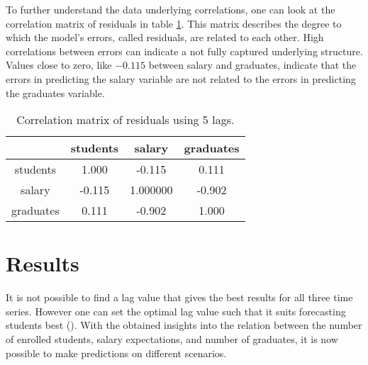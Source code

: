 \documentclass{article}
\theoremstyle{plain}
\theoremstyle{definition}
\theoremstyle{remark}
\begin{document}
To further understand the data underlying correlations, one can look at the correlation matrix
of residuals in table \ref{table:correlation matrix}.
This matrix describes the degree to which the model's errors, called residuals, are related to each other.
High correlations between errors can indicate a not fully captured underlying structure.
Values close to zero, like $-0.115$ between salary and graduates, indicate that the errors
in predicting the salary variable are not related to the errors in predicting the graduates variable.


\begin{table}[H]
    \centering
    \begin{tabular}{c|c|c|c}
        & students & salary & graduates\\
        \hline
        students & 1.000 & -0.115 &  0.111\\
        \hline
        salary & -0.115 & 1.000000 & -0.902\\
        \hline
        graduates & 0.111 & -0.902 &  1.000\\
    \end{tabular}
    \caption{Correlation matrix of residuals using 5 lags.}
    \label{table:correlation matrix}
\end{table}

% 

\section{Results}\label{sec:results}
It is not possible to find a lag value that gives the best results for all three time series.
However one can set the optimal lag value such that it suits forecasting students best ().
With the obtained insights into the relation between the number of enrolled students, salary expectations, and number of graduates,
it is now possible to make predictions on different scenarios.
\end{document}

